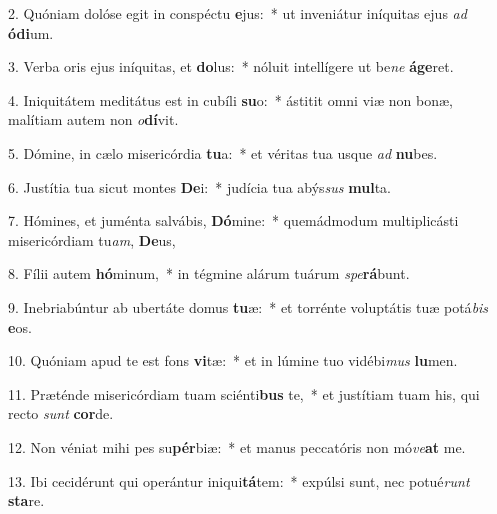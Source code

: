 2. Quóniam dolóse egit in conspéctu \textbf{e}jus:~*  ut inveniátur iníquitas ejus \textit{ad} \textbf{ó}\textbf{di}um.\

3. Verba oris ejus iníquitas, et \textbf{do}lus:~*  nóluit intellígere ut be\textit{ne} \textbf{á}\textbf{ge}ret.\

4. Iniquitátem meditátus est in cubíli \textbf{su}o:~*  ástitit omni viæ non bonæ, malítiam autem non \textit{o}\textbf{dí}vit.\

5. Dómine, in cælo misericórdia \textbf{tu}a:~*  et véritas tua usque \textit{ad} \textbf{nu}bes.\

6. Justítia tua sicut montes \textbf{De}i:~*  judícia tua abýs\textit{sus} \textbf{mul}ta.\

7. Hómines, et juménta salvábis, \textbf{Dó}mine:~*  quemádmodum multiplicásti misericórdiam tu\textit{am}, \textbf{De}us,\

8. Fílii autem \textbf{hó}minum,~*  in tégmine alárum tuárum \textit{spe}\textbf{rá}bunt.\

9. Inebriabúntur ab ubertáte domus \textbf{tu}æ:~*  et torrénte voluptátis tuæ potá\textit{bis} \textbf{e}os.\

10. Quóniam apud te est fons \textbf{vi}tæ:~*  et in lúmine tuo vidébi\textit{mus} \textbf{lu}men.\

11. Præténde misericórdiam tuam sciénti\textbf{bus} te,~*  et justítiam tuam his, qui recto \textit{sunt} \textbf{cor}de.\

12. Non véniat mihi pes su\textbf{pér}biæ:~*  et manus peccatóris non mó\textit{ve}\textbf{at} me.\

13. Ibi cecidérunt qui operántur iniqui\textbf{tá}tem:~*  expúlsi sunt, nec potué\textit{runt} \textbf{sta}re.\

